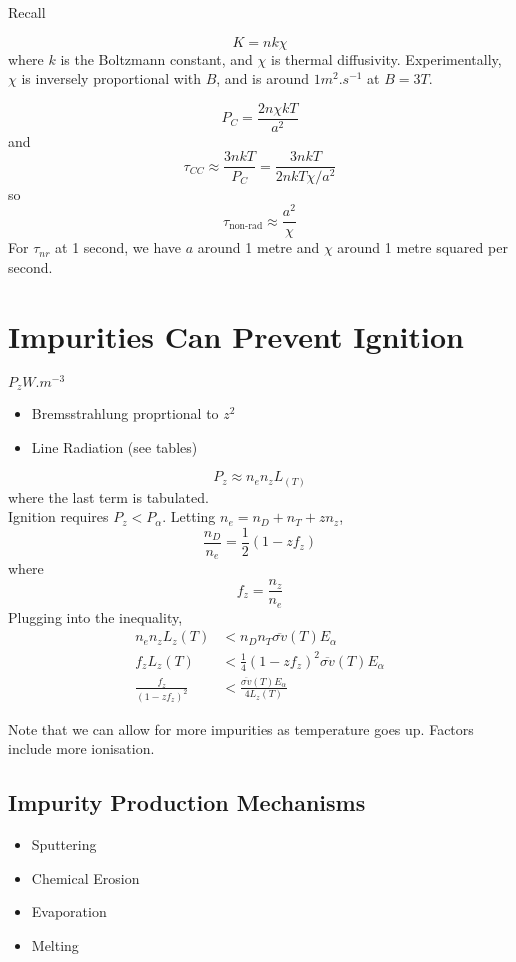 \documentclass[12pt]{article}
\begin{document}
Recall

$$K = nk\chi$$
where $k$ is the Boltzmann constant, and $\chi$ is thermal diffusivity. Experimentally, $\chi$ is inversely proportional with $B$, and is around $1 \unit{m^2.s^{-1}}$ at $B = 3\unit{T}$.

$$P_C = \frac{2n\chi kT}{a^2}$$
and
$$\tau_{CC} \approx \frac{3nkT}{P_C} = \frac{3nkT}{2nkT\chi/a^2}$$
so
$$\tau_{\text{non-rad}} \approx \frac{a^2}{\chi}$$
For $\tau_{nr}$ at 1 second, we have $a$ around 1 metre and $\chi$ around 1 metre squared per second.

\section{Impurities Can Prevent Ignition}

$P_z \unit{W.m^{-3}}$

\begin{itemize}
    \item Bremsstrahlung proprtional to $z^2$
    \item Line Radiation (see tables)
\end{itemize}

$$P_z \approx n_en_zL_(T)$$
where the last term is tabulated. \\

Ignition requires $P_z < P_\alpha$. Letting $n_e = n_D + n_T + zn_z$,
$$\frac{n_D}{n_e} = \frac{1}{2}(1 - zf_z)$$
where
$$f_z = \frac{n_z}{n_e}$$
Plugging into the inequality,
\begin{align*}
    n_en_zL_z(T) &< n_Dn_T\overline{\sigma v}(T)E_\alpha \\
    f_zL_z(T) &< \frac{1}{4}(1-zf_z)^2\overline{\sigma v}(T)E_\alpha \\
    \frac{f_z}{(1-zf_z)^2} &< \frac{\overline{\sigma v}(T)E_\alpha}{4L_z(T)}
\end{align*}

Note that we can allow for more impurities as temperature goes up. Factors include more ionisation.

\subsection{Impurity Production Mechanisms}

\begin{itemize}
    \item Sputtering
    \item Chemical Erosion
    \item Evaporation
    \item Melting
\end{itemize}
\end{document}
